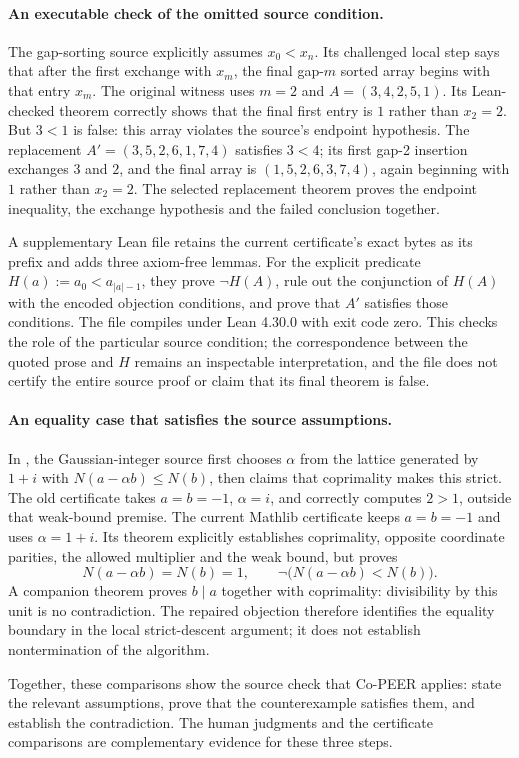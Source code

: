 \paragraph{An executable check of the omitted source condition.}
The gap-sorting source explicitly assumes $x_0<x_n$. Its challenged local step says that after the first exchange with $x_m$, the final gap-$m$ sorted array begins with that entry $x_m$. The original witness uses $m=2$ and $A=(3,4,2,5,1)$. Its Lean-checked theorem correctly shows that the final first entry is $1$ rather than $x_2=2$. But $3<1$ is false: this array violates the source's endpoint hypothesis. The replacement $A'=(3,5,2,6,1,7,4)$ satisfies $3<4$; its first gap-2 insertion exchanges $3$ and $2$, and the final array is $(1,5,2,6,3,7,4)$, again beginning with $1$ rather than $x_2=2$. The selected replacement theorem proves the endpoint inequality, the exchange hypothesis and the failed conclusion together.

A supplementary Lean file retains the current certificate's exact bytes as its prefix and adds three axiom-free lemmas. For the explicit predicate $H(a):=a_0<a_{|a|-1}$, they prove $\neg H(A)$, rule out the conjunction of $H(A)$ with the encoded objection conditions, and prove that $A'$ satisfies those conditions. The file compiles under Lean 4.30.0 with exit code zero. This checks the role of the particular source condition; the correspondence between the quoted prose and $H$ remains an inspectable interpretation, and the file does not certify the entire source proof or claim that its final theorem is false.

\paragraph{An equality case that satisfies the source assumptions.}
In , the Gaussian-integer source first chooses $\alpha$ from the lattice generated by $1+i$ with $N(a-\alpha b)\leq N(b)$, then claims that coprimality makes this strict. The old certificate takes $a=b=-1$, $\alpha=i$, and correctly computes $2>1$, outside that weak-bound premise. The current Mathlib certificate keeps $a=b=-1$ and uses $\alpha=1+i$. Its theorem explicitly establishes coprimality, opposite coordinate parities, the allowed multiplier and the weak bound, but proves
\[
  N(a-\alpha b)=N(b)=1,\qquad \neg\bigl(N(a-\alpha b)<N(b)\bigr).
\]
A companion theorem proves $b\mid a$ together with coprimality: divisibility by this unit is no contradiction. The repaired objection therefore identifies the equality boundary in the local strict-descent argument; it does not establish nontermination of the algorithm.

Together, these comparisons show the source check that Co-PEER applies: state the relevant assumptions, prove that the counterexample satisfies them, and establish the contradiction. The human judgments and the certificate comparisons are complementary evidence for these three steps.
